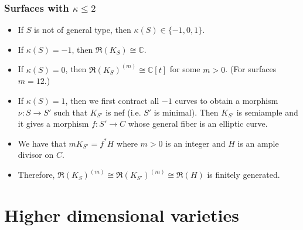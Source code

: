 \documentclass{beamer}
\theoremstyle{plain}
\theoremstyle{definition}
\theoremstyle{remark}
\begin{document}
\begin{frame}
 \frametitle{Surfaces with $\kappa \leq 2$}

\begin{itemize}
\item If $S$ is not of general type, then $\kappa (S)\in \{-1,0,1\}$.
\pause
\item If $\kappa (S)=-1$, then $\mathfrak{R}(K_S)\cong \mathbb{C}$.
\pause
\item If $\kappa (S)=0$, then $\mathfrak{R}(K_S)^{(m)}\cong \mathbb{C}[t]$
for some $m>0$. (For surfaces $m=12$.)
\pause
\item If $\kappa (S)=1$, then we first contract all $-1$ curves to obtain
a morphism $\nu :S\to S'$ such that $K_{S'}$ is nef (i.e. $S'$ is minimal).
Then $K_{S'}$ is semiample and it gives a morphism $f:S'\to C$
whose general fiber is an elliptic curve.
\pause
\item We have that $mK_{S'}=f^*H$ where $m>0$ is an integer and
$H$ is an ample divisor on $C$.
\pause
\item Therefore, $ \mathfrak{R}(K_S)^{(m)}\cong \mathfrak{R}(K_{S'})^{(m)}
\cong \mathfrak{R}( H)$ is finitely generated.
\end{itemize}
\end{frame}

\section{Higher dimensional varieties}
\end{document}
